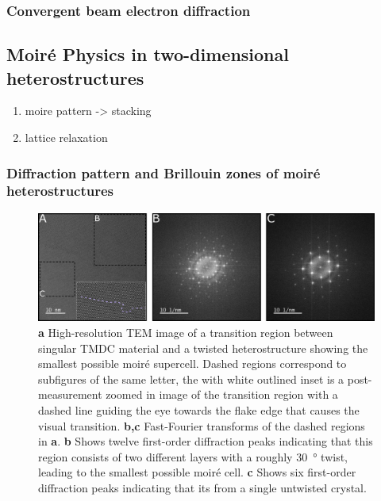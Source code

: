 \subsubsection{Convergent beam electron diffraction}



\subsection{Moiré Physics in two-dimensional heterostructures}
\begin{enumerate}
    \item moire pattern -> stacking
    \item lattice relaxation
\end{enumerate}

\subsubsection{Diffraction pattern and Brillouin zones of moiré heterostructures}
\begin{figure}[h]
    \centering
    \includegraphics[width=1\linewidth, keepaspectratio]{resources/Figures/moire_transition.png}
    \caption{\textbf{a} High-resolution TEM image of a transition region between singular TMDC material and a twisted heterostructure showing the smallest possible moiré supercell. Dashed regions correspond to subfigures of the same letter, the with white outlined inset is a post-measurement zoomed in image of the transition region with a dashed line guiding the eye towards the flake edge that causes the visual transition. \textbf{b,c} Fast-Fourier transforms of the dashed regions in \textbf{a}. \textbf{b} Shows twelve first-order diffraction peaks indicating that this region consists of two different layers with a roughly \SI{30}{\degree} twist, leading to the smallest possible moiré cell. \textbf{c} Shows six first-order diffraction peaks indicating that its from a single untwisted  crystal. }
    \label{fig:moire_trans}
\end{figure}

